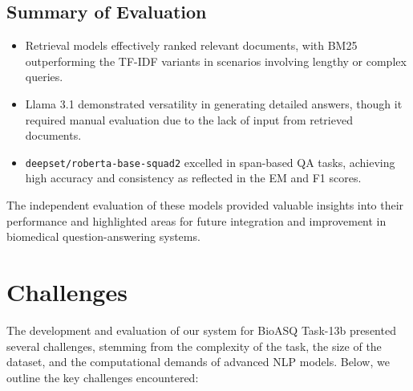 \documentclass{article}
\begin{document}
\subsection{Summary of Evaluation}
\begin{itemize}
    \item Retrieval models effectively ranked relevant documents, with BM25 outperforming the TF-IDF variants in scenarios involving lengthy or complex queries.
    \item Llama 3.1 demonstrated versatility in generating detailed answers, though it required manual evaluation due to the lack of input from retrieved documents.
    \item \texttt{deepset/roberta-base-squad2} excelled in span-based QA tasks, achieving high accuracy and consistency as reflected in the EM and F1 scores.
\end{itemize}
The independent evaluation of these models provided valuable insights into their performance and highlighted areas for future integration and improvement in biomedical question-answering systems.

\section{Challenges}
The development and evaluation of our system for BioASQ Task-13b presented several challenges, stemming from the complexity of the task, the size of the dataset, and the computational demands of advanced NLP models. Below, we outline the key challenges encountered:
\end{document}
